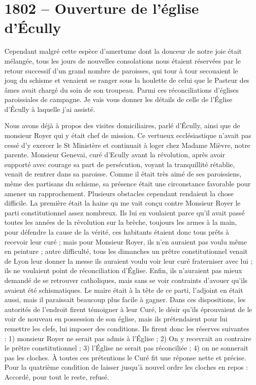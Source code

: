 \documentclass[11pt,a4paper]{report}
\begin{document}
\section*{1802 -- Ouverture de l'église d'Écully}

Cependant malgré cette espèce d'amertume dont la douceur de notre joie était mélangée, tous les jours de nouvelles consolations nous étaient réservées par le retour successif d'un grand nombre de paroisses, qui tour à tour secouaient le joug du schisme et venaient se ranger sous la houlette de celui que le Pasteur des âmes avait chargé du soin de son troupeau. Parmi ces réconciliations d'églises paroissiales de campagne. Je vais vous donner les détails de celle de l'Église d'Écully à laquelle j'ai assisté.

Nous avons déjà à propos des visites domiciliaires, parlé d'Écully, ainsi que de monsieur Royer qui y était chef de mission. Ce vertueux ecclésiastique n'avait pas cessé d'y exercer le St Ministère et continuait à loger chez Madame Mièvre, notre parente. Monsieur Genevai, curé d'Ecully avant la révolution, après avoir supporté avec courage sa part de persécution, voyant la tranquillité rétablie, venait de rentrer dans sa paroisse. Comme il était très aimé de ses paroissiens, même des partisans du schisme, sa présence était une circonstance favorable pour amener un rapprochement. Plusieurs obstacles cependant rendaient la chose difficile. La première était la haine qu me vait conçu contre Monsieur Royer le parti constitutionnel assez nombreux. Ils lui en voulaient parce qu'il avait passé toutes les années de la révolution sur la brèche, toujours les armes à la main, pour défendre la cause de la vérité, ces habitants étaient donc tous prêts à recevoir leur curé ; mais pour Monsieur Royer, ils n'en auraient pas voulu même en peinture ; autre difficulté, tous les dimanches un prêtre constitutionnel venait de Lyon leur donner la messe ils auraient voulu voir leur curé fraterniser avec lui ; ils ne voulaient point de réconciliation d'Église. Enfin, ils n'auraient pas mieux demandé de se retrouver catholiques, mais sans se voir contraints d'avouer qu'ils avaient été schismatiques. Le maire était à la tête de ce parti, l'adjoint en était aussi, mais il paraissait beaucoup plus facile à gagner. Dans ces dispositions, les autorités de l'endroit firent témoigner à leur Curé, le désir qu'ils éprouvaient de le voir de nouveau en possession de son église, mais ils prétendaient pour lui remettre les clefs, lui imposer des conditions. Ils firent donc les réserves suivantes : 1) monsieur Royer ne serait pas admis à l'Église ; 2) On y recevrait au contraire le prêtre constitutionnel ; 3) l'Église ne serait pas réconciliée ; 4) on ne sonnerait pas les cloches. À toutes ces prétentions le Curé fit une réponse nette et précise. Pour la quatrième condition de laisser jusqu'à nouvel ordre les cloches en repos : Accordé, pour tout le reste, refusé.
\end{document}
